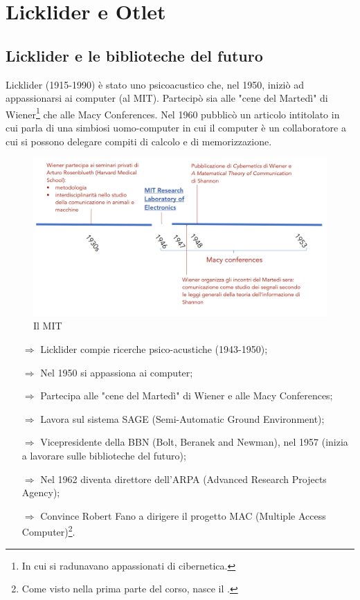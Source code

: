 \chapter{Licklider e Otlet}

\section{Licklider e le biblioteche del futuro}

Licklider (1915-1990) è stato uno psicoacustico che, nel 1950, iniziò ad appassionarsi
ai computer (al MIT). Partecipò sia alle "cene del Martedì" di Wiener\footnote{In cui si radunavano appassionati di cibernetica.} che 
alle Macy Conferences. Nel 1960 pubblicò un articolo intitolato  in cui
parla di una simbiosi uomo-computer in cui il computer è un collaboratore a cui si possono delegare
compiti di calcolo e di memorizzazione. 

\begin{figure}[h]
    \centering
    \includegraphics[scale=0.25]{images/MIT.png}
    \caption{Il MIT}
\end{figure}

\begin{itemize}
    \item [$\Rightarrow$] Licklider compie ricerche psico-acustiche (1943-1950);
    \item [$\Rightarrow$] Nel 1950 si appassiona ai computer;
    \item [$\Rightarrow$] Partecipa alle "cene del Martedì" di Wiener e alle Macy Conferences;
    \item [$\Rightarrow$] Lavora sul sistema SAGE (Semi-Automatic Ground Environment);
    \item [$\Rightarrow$] Vicepresidente della BBN (Bolt, Beranek and Newman), nel 1957 (inizia a lavorare sulle biblioteche del futuro);
    \item [$\Rightarrow$] Nel 1962 diventa direttore dell'ARPA (Advanced Research Projects Agency);
    \item [$\Rightarrow$] Convince Robert Fano a dirigere il progetto MAC (Multiple Access Computer)\footnote{Come visto nella prima parte del corso, nasce il .}.
\end{itemize}

